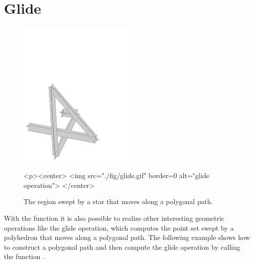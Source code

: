 \section{Glide}

\begin{figure}
  \begin{ccTexOnly}
    \begin{center}
      \includegraphics[width=0.5\textwidth]{Minkowski_sum_3/fig/glide}
    \end{center}
  \end{ccTexOnly}
  \begin{ccHtmlOnly}
    <p><center>
    <img src="./fig/glide.gif" border=0 alt="glide operation">
    </center>
  \end{ccHtmlOnly}
  \caption{The region swept by a star that moves along a polygonal path.}
\end{figure}

With the function  it is also possible to realize
other interesting geometric operations like the glide operation, which
computes the point set swept by a polyhedron that moves along a
polygonal path. The following example shows how to construct a
polygonal path and then compute the glide operation by calling the
function .

